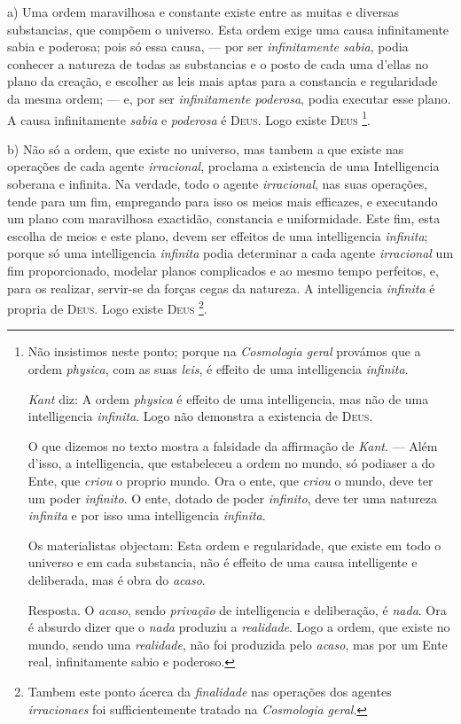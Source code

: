 a) Uma ordem maravilhosa e constante existe entre as muitas e diversas substancias, que compõem o universo. Esta ordem exige uma causa infinitamente sabia e poderosa; pois só essa causa, --- por ser \emph{infinitamente sabia}, podia conhecer a natureza de todas as substancias e o posto de cada uma d'ellas no plano da creação, e escolher as leis mais aptas para a constancia e regularidade da mesma ordem; --- e, por ser \emph{infinitamente poderosa}, podia executar esse plano. A causa infinitamente \emph{sabia} e \emph{poderosa} é \textsc{Deus}. Logo existe \textsc{Deus} \footnote{Não insistimos neste ponto; porque na \emph{Cosmologia geral} provámos que a ordem \emph{physica}, com as suas \emph{leis}, é effeito de uma intelligencia \emph{infinita}.\par \emph{Kant} diz: A ordem \emph{physica} é effeito de uma intelligencia, mas não de uma intelligencia \emph{infinita}. Logo não demonstra a existencia de \textsc{Deus}.\par O que dizemos no texto mostra a falsidade da affirmação de \emph{Kant}. --- Além d'isso, a intelligencia, que estabeleceu a ordem no mundo, só podiaser a do Ente, que \emph{criou} o proprio mundo. Ora o ente, que \emph{criou} o mundo, deve ter um poder \emph{infinito}. O ente, dotado de poder \emph{infinito}, deve ter uma natureza \emph{infinita} e por isso uma intelligencia \emph{infinita}.\par Os materialistas objectam: Esta ordem e regularidade, que existe em todo o universo e em cada substancia, não é effeito de uma causa intelligente e deliberada, mas é obra do \emph{acaso}.\par Resposta. O \emph{acaso}, sendo \emph{privação} de intelligencia e deliberação, é \emph{nada}. Ora é absurdo dizer que o \emph{nada} produziu a \emph{realidade}. Logo a ordem, que existe no mundo, sendo uma \emph{realidade}, não foi produzida pelo \emph{acaso}, mas por um Ente real, infinitamente sabio e poderoso.}.

b) Não só a ordem, que existe no universo, mas tambem a que existe nas operações de cada agente \emph{irracional}, proclama  a existencia de uma Intelligencia soberana e infinita. Na verdade, todo o agente \emph{irracional}, nas suas operações, tende para um fim, empregando para isso os meios mais efficazes, e executando um plano com maravilhosa exactidão, constancia e uniformidade. Este fim, esta escolha de meios e este plano, devem ser effeitos de uma intelligencia \emph{infinita}; porque só uma intelligencia \emph{infinita} podia determinar a cada agente \emph{irracional} um fim proporcionado, modelar planos complicados e ao mesmo tempo perfeitos, e, para os realizar, servir-se da forças cegas da natureza. A intelligencia \emph{infinita} é propria de \textsc{Deus}. Logo existe \textsc{Deus} \footnote{Tambem este ponto ácerca da \emph{finalidade} nas operações dos agentes \emph{irracionaes} foi sufficientemente tratado na \emph{Cosmologia geral}.}.

